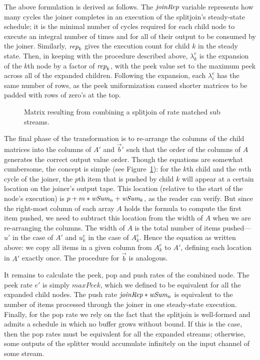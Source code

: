 {The above formulation is derived as follows.  The $\mbox{\it joinRep}$
variable represents how many cycles the joiner completes in an
execution of the splitjoin's steady-state schedule; it is
the minimal number of cycles required for each child node to execute
an integral number of times and for all of their output to be consumed
by the joiner. Similarly, $\mbox{\it rep}_k$ gives the execution count for
child $k$ in the steady state.  Then, in keeping with the procedure
described above, $\lambda_k^e$ is the expansion of the $k$th node by
a factor of $\mbox{\it rep}_k$, with the peek value set to the maximum peek
across all of the expanded children.  Following the expansion, each
$\lambda_i^e$ has the same number of rows, as the peek uniformization
caused shorter matrices to be padded with rows of zero's at the top.

\begin{figure}[t]
\center
\epsfxsize=3.2in
\caption{Matrix resulting from combining a splitjoin of rate matched sub streams.
\protect\label{fig:splitjoin-duplicate-matrix}}
\vspace{-4pt}
\makeline
\vspace{-18pt}
\end{figure}

The final phase of the transformation is to re-arrange the columns of
the child matrices into the columns of $A'$ and $\vec{b}'$ such that
the order of the columns of $A$ generates the correct output value
order.  Though the equations are somewhat cumbersome, the concept is
simple (see Figure~\ref{fig:splitjoin-duplicate-matrix}): for the
$k$th child and the $m$th cycle of the joiner, the $p$th item that is
pushed by child $k$ will appear at a certain location on the joiner's
output tape.  This location (relative to the start of the node's
execution) is $p + m * \mbox{\it wSum}_n + \mbox{\it wSum}_k$, as the reader can
verify.  But since the right-most column of each array $A$ holds the
formula to compute the first item pushed, we need to subtract this
location from the width of $A$ when we are re-arranging the
columns. The width of $A$ is the total number of items pushed---$u'$
in the case of $A'$ and $u_k^e$ in the case of $A_k^e$.  Hence the
equation as written above: we copy all items in a given column from
$A_k^e$ to $A'$, defining each location in $A'$ exactly once.  The
procedure for $\vec{b}$ is analogous.

It remains to calculate the peek, pop and push rates of the combined
node.  The peek rate $e'$ is simply $maxPeek$, which we defined to be
equivalent for all the expanded child nodes.  The push rate
$\mbox{\it joinRep}*\mbox{\it wSum}_n$ is equivalent to the number of items
processed through the joiner in one steady-state execution.  Finally,
for the pop rate we rely on the fact that the splitjoin is well-formed
and admits a schedule in which no buffer grows without bound.  If this
is the case, then the pop rates must be equivalent for all the
expanded streams; otherwise, some outputs of the splitter would
accumulate infinitely on the input channel of some stream.

}

